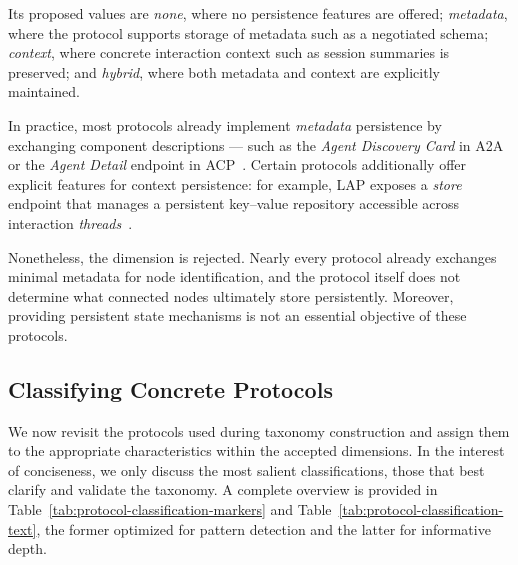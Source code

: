 \documentclass[pdflatex,sn-mathphys-num]{sn-jnl}%
\theoremstyle{thmstyleone}%
\theoremstyle{thmstyletwo}%
\theoremstyle{thmstylethree}%
\begin{document}
Its proposed values are \textit{none}, where no persistence features are offered; \textit{metadata}, where the protocol supports storage of metadata such as a negotiated schema; \textit{context}, where concrete interaction context such as session summaries is preserved; and \textit{hybrid}, where both metadata and context are explicitly maintained.

In practice, most protocols already implement \textit{metadata} persistence by exchanging component descriptions — such as the \textit{Agent Discovery Card} in A2A~\cite{a2adocsagentdiscovery} or the \textit{Agent Detail} endpoint in ACP~\cite{acpcoreconcepts}. Certain protocols additionally offer explicit features for context persistence: for example, LAP exposes a \textit{store} endpoint that manages a persistent key–value repository accessible across interaction \textit{threads}~\cite{lapdocsapi}.

Nonetheless, the dimension is rejected. Nearly every protocol already exchanges minimal metadata for node identification, and the protocol itself does not determine what connected nodes ultimately store persistently. Moreover, providing persistent state mechanisms is not an essential objective of these protocols. 


\subsection{Classifying Concrete Protocols}
\label{sec:taxonomy-design-classifying-protocols}

We now revisit the protocols used during taxonomy construction and assign them to the appropriate characteristics within the accepted dimensions. In the interest of conciseness, we only discuss the most salient classifications, those that best clarify and validate the taxonomy. A complete overview is provided in Table~\ref{tab:protocol-classification-markers} and Table~\ref{tab:protocol-classification-text}, the former optimized for pattern detection and the latter for informative depth.
\end{document}

